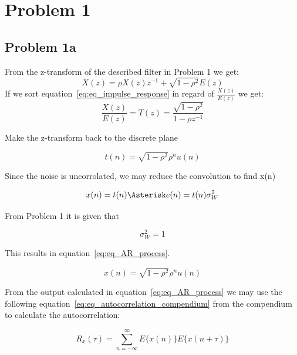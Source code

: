 \chapter{Problem 1}
  \section{Problem 1a}
	
	From the z-transform of the described filter in Problem 1 we get:
	\begin{equation}
		X(z)=\rho X(z)z^{-1}+\sqrt{1-\rho ^2}E(z) 
		\label{eq:eq_impulse_response}
	\end{equation}
	If we sort equation~\ref{eq:eq_impulse_response} in regard of $\frac{X(z)}{E(z)}$ we get:
	\begin{equation*}
		\frac{X(z)}{E(z)}=T(z)=\frac{\sqrt{1-\rho ^2}}{1-\rho z^{-1}}	
		\label{eq:eq_freq_resp_x}
	\end{equation*}
	
	Make the z-transform back to the discrete plane
	
	\begin{equation*}
		t(n)=\sqrt{1-\rho ^2}\rho ^nu(n)
	\end{equation*}
	
	Since the noise is uncorrolated, we may reduce the convolution to find x(n)
	
	\begin{equation*}
		x(n)=t(n)\Asterisk e(n)=t(n)\sigma ^2_W
	\end{equation*}
	
	From Problem 1 it is given that
	
	\begin{equation*}
		\sigma ^2_W=1
	\end{equation*}
	
	This results in equation~\ref{eq:eq_AR_process}.
	
	\begin{equation}
		x(n)=\sqrt{1-\rho ^2}\rho ^nu(n)
		\label{eq:eq_AR_process}
	\end{equation}
	
	From the output calculated in equation~\ref{eq:eq_AR_process} we may use the following equation~\ref{eq:eq_autocorrelation_compendium} from the compendium to calculate the autocorrelation:
	
	\begin{equation}
		R_x(\tau)=\sum_{n=-\infty}^{\infty}E\{x(n)\}E\{x(n+\tau)\}
		\label{eq:eq_autocorrelation_compendium}
	\end{equation}
	

